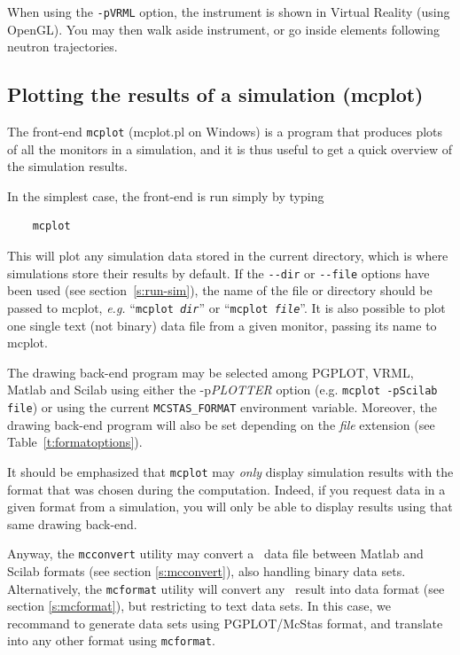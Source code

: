 When using the \verb+-pVRML+ option, the instrument is shown in Virtual Reality (using OpenGL). You may then walk aside instrument, or go inside elements following neutron trajectories.

\subsection{Plotting the results of a simulation (mcplot)}
\label{s:mcplot}

The front-end \verb+mcplot+ (mcplot.pl on Windows) is a program that produces
plots of all the monitors in a simulation, and it is thus useful to get
a quick overview of the simulation results.

In the simplest case, the front-end is run simply by typing
\begin{verbatim}
    mcplot
\end{verbatim}
This will plot any simulation data stored in the current directory,
which is where simulations store their results by default. If the
\verb+--dir+ or \verb+--file+ options have been used (see
section~\ref{s:run-sim}), the name of the file or directory should be
passed to mcplot, {\em e.g.} ``\texttt{mcplot {\it dir}}'' or ``\texttt{mcplot
  {\it file}}''.
It is also possible to plot one single text (not binary) data file from a given monitor, passing its name to mcplot.

The drawing back-end program may be selected among PGPLOT, VRML, Matlab and Scilab using either the -p{\it PLOTTER} option (e.g. \verb+mcplot -pScilab file+) or using the current \verb+MCSTAS_FORMAT+ environment variable.  Moreover, the drawing back-end program will also be set depending on the {\it file} extension (see Table~\ref{t:formatoptions}).

It should be emphasized that \verb+mcplot+ may \emph{only} display simulation results with the format that was chosen during the computation. Indeed, if you request data in a given format from a simulation, you will only be able to display results using that same drawing back-end.

Anyway, the \verb+mcconvert+ utility may convert a \MCS\ data file between Matlab and Scilab formats (see section \ref{s:mcconvert}), also handling binary data sets. Alternatively, the \verb+mcformat+ utility will convert any \MCS\ result into data format (see section \ref{s:mcformat}), but restricting to text data sets. In this case, we recommand to generate data sets using PGPLOT/McStas format, and translate into any other format using \verb+mcformat+.

